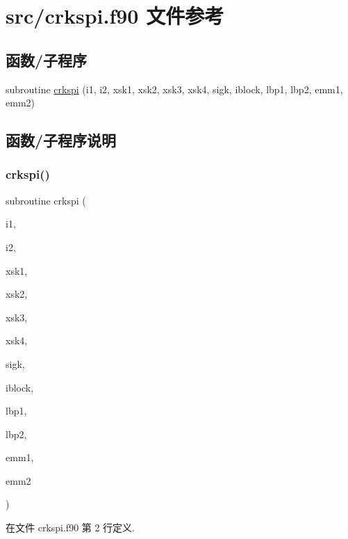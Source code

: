 \hypertarget{crkspi_8f90}{}\section{src/crkspi.f90 文件参考}
\label{crkspi_8f90}
\subsection*{函数/子程序}
\begin{DoxyCompactItemize}
\item 
subroutine \mbox{\hyperlink{crkspi_8f90_ad91c520d75a564c88c22b35ef12fd506}{crkspi}} (i1, i2, xsk1, xsk2, xsk3, xsk4, sigk, iblock, lbp1, lbp2, emm1, emm2)
\end{DoxyCompactItemize}


\subsection{函数/子程序说明}
\mbox{\label{crkspi_8f90_ad91c520d75a564c88c22b35ef12fd506}} 
\subsubsection{\texorpdfstring{crkspi()}{crkspi()}}
{\footnotesize\ttfamily subroutine crkspi (\begin{DoxyParamCaption}\item[{}]{i1,  }\item[{}]{i2,  }\item[{}]{xsk1,  }\item[{}]{xsk2,  }\item[{}]{xsk3,  }\item[{}]{xsk4,  }\item[{}]{sigk,  }\item[{}]{iblock,  }\item[{}]{lbp1,  }\item[{}]{lbp2,  }\item[{}]{emm1,  }\item[{}]{emm2 }\end{DoxyParamCaption})}



在文件 crkspi.\+f90 第 2 行定义.

